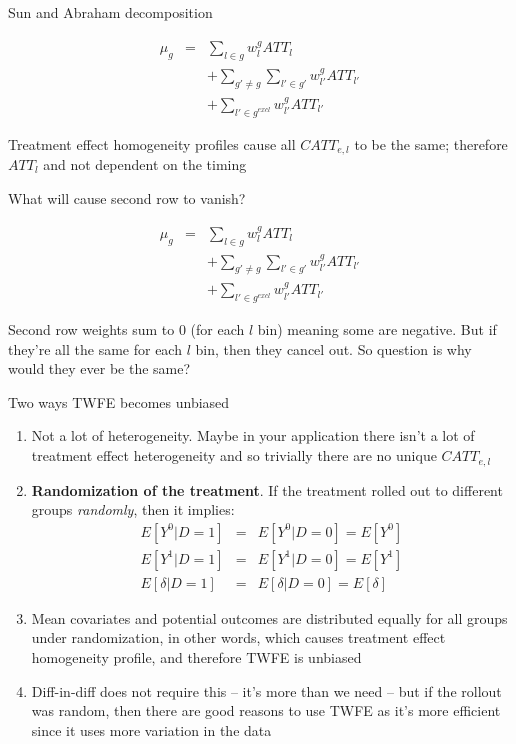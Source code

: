 \documentclass{beamer}
\begin{document}
\begin{frame}{Sun and Abraham decomposition}

\begin{eqnarray*}
\mu_g &=& \sum_{l \in g} w^g_l ATT_l \\
&&+ \sum_{g' \neq g} \sum_{l' \in g'} w^g_{l'} ATT_{l'} \\
&&+ \sum_{l' \in g^{excl}} w^g_{l'}ATT_{l'}
\end{eqnarray*}

Treatment effect homogeneity profiles cause all $CATT_{e,l}$ to be the same; therefore $ATT_{l}$ and not dependent on the timing

\end{frame}

\begin{frame}{What will cause second row to vanish?}

\begin{eqnarray*}
\mu_g &=& \sum_{l \in g} w^g_l ATT_l \\
&&+ \sum_{g' \neq g} \sum_{l' \in g'} w^g_{l'} ATT_{l'} \\
&&+ \sum_{l' \in g^{excl}} w^g_{l'}ATT_{l'}
\end{eqnarray*}

Second row weights sum to 0 (for each $l$ bin) meaning some are negative. But if they're all the same for each $l$ bin, then they cancel out. So question is why would they ever be the same?

\end{frame}

\begin{frame}{Two ways TWFE becomes unbiased}

\begin{enumerate}
\item Not a lot of heterogeneity.  Maybe in your application there isn't a lot of treatment effect heterogeneity and so trivially there are no unique $CATT_{e,l}$ 
\item \textbf{Randomization of the treatment}. If the treatment rolled out to different groups \emph{randomly}, then it implies:
	\begin{eqnarray*}
	E[Y^0|D=1] &=&E[Y^0|D=0] = E[Y^0] \\
	E[Y^1|D=1] &=&E[Y^1|D=0] = E[Y^1] \\
	E[\delta | D=1] &=&E[\delta | D=0] = E[\delta]
	\end{eqnarray*}
\item Mean covariates and potential outcomes are distributed equally for all groups under randomization, in other words, which causes treatment effect homogeneity profile, and therefore TWFE is unbiased
\item Diff-in-diff does not require this -- it's more than we need -- but if the rollout was random, then there are good reasons to use TWFE as it's more efficient since it uses more variation in the data

\end{enumerate}

\end{frame}
\end{document}
